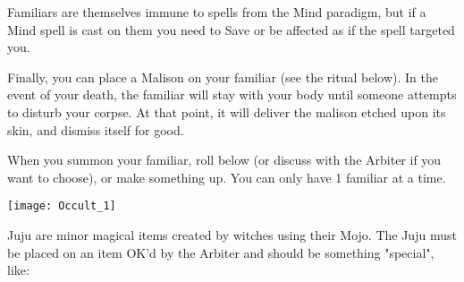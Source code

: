 Familiars are themselves immune to spells from the Mind paradigm, but if a Mind spell is cast on them you need to Save or be affected as if the spell targeted you.

Finally, you can place a Malison on your familiar (see the ritual below).  In the event of your death, the familiar will stay with your body until someone attempts to disturb your corpse.  At that point, it will deliver the malison etched upon its skin, and dismiss itself for good.

When you summon your familiar, roll below (or discuss with the Arbiter if you want to choose), or make something up.  You can only have 1 familiar at a time.






  \begin{center}
  \texttt{[image: Occult\_1]}
  \end{center}


\OCCULT[
  Name=Create Juju,
  Link=occultism-create-juju,
  Success=varies,
  Cost=varies
]


Juju are minor magical items created by witches using their Mojo.  The Juju must be placed on an item OK'd by the Arbiter and should be something "special", like:


